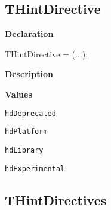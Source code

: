 \documentclass{report}
\newif\ifpdf
\begin{document}
\subsection*{THintDirective}
\fi
\label{PasDoc_Items-THintDirective}
\begin{list}{}{
\setlength{\itemindent}{0cm}
\setlength{\listparindent}{0cm}
\setlength{\leftmargin}{\evensidemargin}
\addtolength{\leftmargin}{\tmplength}
\settowidth{\labelsep}{X}
\addtolength{\leftmargin}{\labelsep}
\setlength{\labelwidth}{\tmplength}
}
\item[\textbf{Declaration}\hfill]
\ifpdf
\begin{flushleft}
\fi
\begin{ttfamily}
THintDirective = (...);\end{ttfamily}

\ifpdf
\end{flushleft}
\fi

\par
\item[\textbf{Description}]
 \item[\textbf{Values}]
\begin{description}
\item[\texttt{hdDeprecated}] \label{PasDoc_Items-hdDeprecated}
\index{}
 
\item[\texttt{hdPlatform}] \label{PasDoc_Items-hdPlatform}
\index{}
 
\item[\texttt{hdLibrary}] \label{PasDoc_Items-hdLibrary}
\index{}
 
\item[\texttt{hdExperimental}] \label{PasDoc_Items-hdExperimental}
\index{}
 
\end{description}


\end{list}
\ifpdf
\subsection*{\large{\textbf{THintDirectives}}\normalsize\hspace{1ex}\hrulefill}
\else
\end{document}
